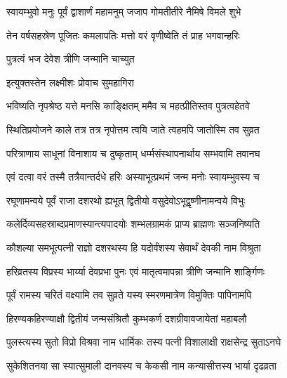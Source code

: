 
\twolineshloka
{स्वायम्भुवो मनुः पूर्वं द्वाशार्णं महामनुम्}
{जजाप गोमतीतीरे नैमिषे विमले शुभे}%

\twolineshloka
{तेन वर्षसहस्रेण पूजितः कमलापतिः}
{मत्तो वरं वृणीष्वेति तं प्राह भगवान्हरिः}%


\onelineshloka
{पुत्रत्वं भज देवेश त्रीणि जन्मानि चाच्युत}%


\onelineshloka
{इत्युक्तस्तेन लक्ष्मीशः प्रोवाच सुमहागिरा}%


\twolineshloka
{भविष्यति नृपश्रेष्ठ यत्ते मनसि काङ्क्षितम्}
{ममैव च महत्प्रीतिस्तव पुत्रत्वहेतवे}%

\twolineshloka
{स्थितिप्रयोजने काले तत्र तत्र नृपोत्तम}
{त्वयि जाते त्वहमपि जातोस्मि तव सुव्रत}%

\twolineshloka
{परित्राणाय साधूनां विनाशाय च दुष्कृताम्}
{धर्म्मसंस्थापनार्थाय सम्भवामि तवानघ}%


\twolineshloka
{एवं दत्वा वरं तस्मै तत्रैवान्तर्दधे हरिः}
{अस्याभूत्प्रथमं जन्म मनोः स्वायम्भुवस्य च}%

\twolineshloka
{रघूणामन्वये पूर्वं राजा दशरथो ह्यभूत्}
{द्वितीयो वसुदेवोऽभूद्वृष्णीनामन्वये विभुः}%

\twolineshloka
{कलेर्दिव्यसहस्राब्दप्रमाणस्यान्त्यपादयोः}
{शम्भलग्रामकं प्राप्य ब्राह्मणः सञ्जनिष्यति}%

\twolineshloka
{कौशल्या समभूत्पत्नी राज्ञो दशरथस्य हि}
{यदोर्वंशस्य सेवार्थं देवकी नाम विश्रुता}%

\twolineshloka
{हरिव्रतस्य विप्रस्य भार्य्या देवप्रभा पुनः}
{एवं मातृत्वमापन्ना त्रीणि जन्मानि शार्ङ्गिणः}%

\twolineshloka
{पूर्वं रामस्य चरितं वक्ष्यामि तव सुव्रते}
{यस्य स्मरणमात्रेण विमुक्तिः पापिनामपि}%

\twolineshloka
{हिरण्यकहिरण्याक्षौ द्वितीयं जन्मसंश्रितौ}
{कुम्भकर्ण दशग्रीवावजायेतां महाबलौ}%

\twolineshloka
{पुलस्त्यस्य सुतो विप्रो विश्रवा नाम धार्मिकः}
{तस्य पत्नी विशालाक्षी राक्षसेन्द्र सुताऽनघे}%

\twolineshloka
{सुकेशितनया सा स्यात्सुमाली दानवस्य च}
{केकसी नाम कन्यासीत्तस्य भार्या दृढव्रता}%

